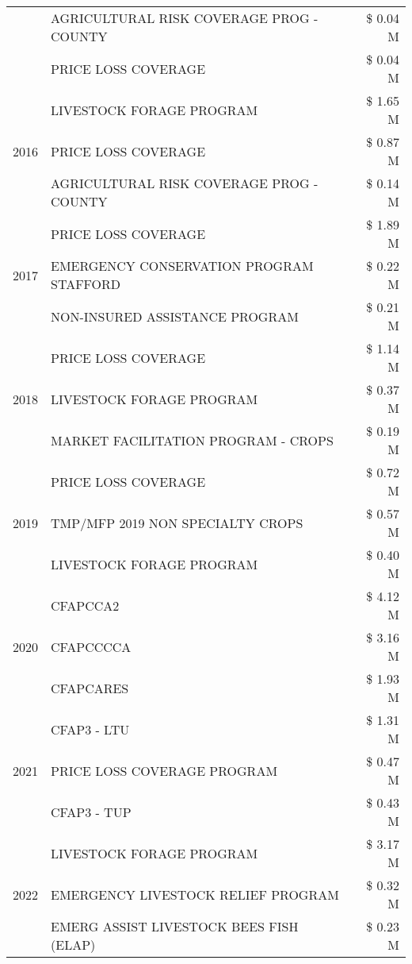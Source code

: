\begin{tabular}{llr}
 & AGRICULTURAL RISK COVERAGE PROG - COUNTY & \$ 0.04 M \\
 & PRICE LOSS COVERAGE & \$ 0.04 M \\
\cline{1-3}
\multirow[t]{3}{*}{2016} & LIVESTOCK FORAGE PROGRAM & \$ 1.65 M \\
 & PRICE LOSS COVERAGE & \$ 0.87 M \\
 & AGRICULTURAL RISK COVERAGE PROG - COUNTY & \$ 0.14 M \\
\cline{1-3}
\multirow[t]{3}{*}{2017} & PRICE LOSS COVERAGE & \$ 1.89 M \\
 & EMERGENCY CONSERVATION PROGRAM STAFFORD & \$ 0.22 M \\
 & NON-INSURED ASSISTANCE PROGRAM & \$ 0.21 M \\
\cline{1-3}
\multirow[t]{3}{*}{2018} & PRICE LOSS COVERAGE & \$ 1.14 M \\
 & LIVESTOCK FORAGE PROGRAM & \$ 0.37 M \\
 & MARKET FACILITATION PROGRAM - CROPS & \$ 0.19 M \\
\cline{1-3}
\multirow[t]{3}{*}{2019} & PRICE LOSS COVERAGE & \$ 0.72 M \\
 & TMP/MFP 2019 NON SPECIALTY CROPS & \$ 0.57 M \\
 & LIVESTOCK FORAGE PROGRAM & \$ 0.40 M \\
\cline{1-3}
\multirow[t]{3}{*}{2020} & CFAPCCA2 & \$ 4.12 M \\
 & CFAPCCCCA & \$ 3.16 M \\
 & CFAPCARES & \$ 1.93 M \\
\cline{1-3}
\multirow[t]{3}{*}{2021} & CFAP3 - LTU & \$ 1.31 M \\
 & PRICE LOSS COVERAGE PROGRAM & \$ 0.47 M \\
 & CFAP3 - TUP & \$ 0.43 M \\
\cline{1-3}
\multirow[t]{3}{*}{2022} & LIVESTOCK FORAGE PROGRAM & \$ 3.17 M \\
 & EMERGENCY LIVESTOCK RELIEF PROGRAM & \$ 0.32 M \\
 & EMERG ASSIST LIVESTOCK BEES FISH (ELAP) & \$ 0.23 M \\
\cline{1-3}
\bottomrule
\end{tabular}
